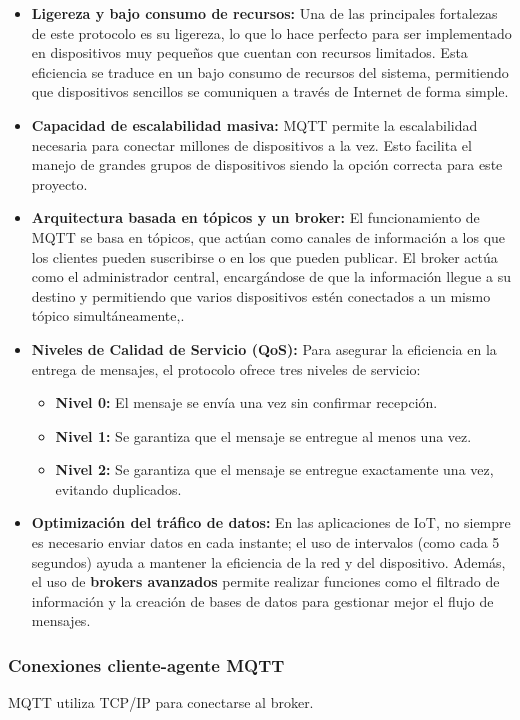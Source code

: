 \documentclass[12pt, a4paper]{article}
\begin{document}
    \begin{itemize}
        \item \textbf{Ligereza y bajo consumo de recursos:} Una de las principales fortalezas de este protocolo es su ligereza, lo que lo hace perfecto para ser implementado en dispositivos muy pequeños que cuentan con recursos limitados. Esta eficiencia se traduce en un bajo consumo de recursos del sistema, permitiendo que dispositivos sencillos se comuniquen a través de Internet de forma simple.
        \item \textbf{Capacidad de escalabilidad masiva:} MQTT permite la escalabilidad necesaria para conectar millones de dispositivos a la vez. Esto facilita el manejo de grandes grupos de dispositivos siendo la opción correcta para este proyecto.
        \item \textbf{Arquitectura basada en tópicos y un broker:} El funcionamiento de MQTT se basa en tópicos, que actúan como canales de información a los que los clientes pueden suscribirse o en los que pueden publicar. El broker actúa como el administrador central, encargándose de que la información llegue a su destino y permitiendo que varios dispositivos estén conectados a un mismo tópico simultáneamente,.
        \item \textbf{Niveles de Calidad de Servicio (QoS):} Para asegurar la eficiencia en la entrega de mensajes, el protocolo ofrece tres niveles de servicio:
        \begin{itemize}
            \item \textbf{Nivel 0:} El mensaje se envía una vez sin confirmar recepción.
            \item \textbf{Nivel 1:} Se garantiza que el mensaje se entregue al menos una vez.
            \item \textbf{Nivel 2:} Se garantiza que el mensaje se entregue exactamente una vez, evitando duplicados.
        \end{itemize}
        \item \textbf{Optimización del tráfico de datos:} En las aplicaciones de IoT, no siempre es necesario enviar datos en cada instante; el uso de intervalos (como cada 5 segundos) ayuda a mantener la eficiencia de la red y del dispositivo. Además, el uso de \textbf{brokers avanzados} permite realizar funciones como el filtrado de información y la creación de bases de datos para gestionar mejor el flujo de mensajes.
    \end{itemize}

    {\color{red} \subsubsection*{Conexiones cliente-agente MQTT}}
    MQTT utiliza TCP/IP para conectarse al broker.
    
\end{document}
